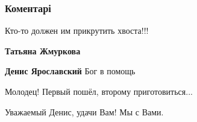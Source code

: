  
 
 
 
 
\subsubsection{Коментарі}

\begin{itemize}

 
Кто-то должен им прикрутить хвоста!!!

\begin{itemize}
 
\textbf{Татьяна Жмуркова} 🤝

 
\textbf{Денис Ярославский} Бог в помощь

 
Молодец! Первый пошёл, второму приготовиться...

 
Уважаемый Денис, удачи Вам! Мы с Вами.


\end{itemize}
\end{itemize}
